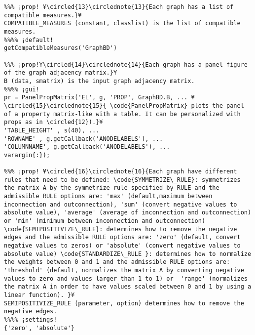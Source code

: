 \documentclass{tufte-handout}
\begin{document}
\begin{lstlisting}
%%% ¡prop! ¥\circled{13}\circlednote{13}{Each graph has a list of compatible measures.}¥
COMPATIBLE_MEASURES (constant, classlist) is the list of compatible measures.
%%%% ¡default!
getCompatibleMeasures('GraphBD')

%%% ¡prop!¥\circled{14}\circlednote{14}{Each graph has a panel figure of the graph adjacency matrix.}¥
B (data, smatrix) is the input graph adjacency matrix.
%%%% ¡gui!
pr = PanelPropMatrix('EL', g, 'PROP', GraphBD.B, ... ¥\circled{15}\circlednote{15}{ \code{PanelPropMatrix} plots the panel of a property matrix-like with a table. It can be personalized with props as in \circled{12}).}¥
'TABLE_HEIGHT' , s(40), ...
'ROWNAME' , g.getCallback('ANODELABELS'), ... 
'COLUMNNAME', g.getCallback('ANODELABELS'), ...
varargin{:});

%%% ¡prop! ¥\circled{16}\circlednote{16}{Each graph have different rules that need to be defined: \code{SYMMETRIZE\_RULE}: symmetrizes the matrix A by the symmetrize rule specified by RULE and the admissible RULE options are: 'max' (default,maximum between inconnection and outconnection), 'sum' (convert negative values to absolute value), 'average' (average of inconnection and outconnection) or 'min' (minimum between inconnection and outconnection) \code{SEMIPOSITIVIZE\_RULE}: determines how to remove the negative edges and the admissible RULE options are: 'zero' (default, convert negative values to zeros) or 'absolute' (convert negative values to absolute value) \code{STANDARDIZE\_RULE }: determines how to normalize the weights between 0 and 1 and the admissible RULE options are: 'threshold' (default, normalizes the matrix A by converting negative values to zero and values larger than 1 to 1) or  'range' (normalizes the matrix A in order to have values scaled between 0 and 1 by using a linear function). }¥
SEMIPOSITIVIZE_RULE (parameter, option) determines how to remove the negative edges.
%%%% ¡settings!
{'zero', 'absolute'}

\end{lstlisting}

\clearpage
\end{document}
